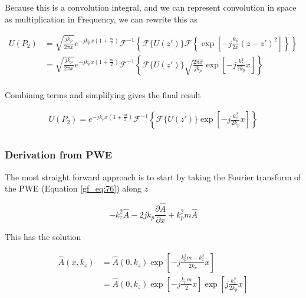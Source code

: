 Because this is a convolution integral, and we can represent convolution in space as multiplication in Frequency, we can rewrite this as

\begin{equation}
\begin{aligned}
U(P_2) &=\sqrt{\frac{jk_p}{2\pi x}}e^{-jk_px\left(1+\frac{m}{2}\right)}\mathcal{F}^{-1}\left\{\mathcal{F}\{U(z')\}\mathcal{F}\left\{ \exp\left[-j \frac{k_p}{2x}\left(z-z'\right)^2 \right]\right\} \right\} \\
&=\sqrt{\frac{jk_p}{2\pi x}}e^{-jk_px\left(1+\frac{m}{2}\right)}\mathcal{F}^{-1}\left\{\mathcal{F}\{U(z')\}\sqrt{\frac{2\pi x}{jk_p}}\exp\left[-j\frac{k_z^2}{2k_p}x \right] \right\} \\
\label{gf_eq:302}
\end{aligned}
\end{equation}
\renewcommand{\baselinestretch}{2} \small\normalsize

\noindent Combining terms and simplifying gives the final result

\begin{equation}
\begin{aligned}
U(P_2) = e^{-jk_px\left(1+\frac{m}{2}\right)}\mathcal{F}^{-1}\left\{\mathcal{F}\{U(z')\}\exp\left[-j\frac{k_z^2}{2k_p}x \right] \right\} \\
\label{gf_eq:303}
\end{aligned}
\end{equation}
\renewcommand{\baselinestretch}{2} \small\normalsize


\subsubsection{Derivation from PWE}
\noindent The most straight forward approach is to start by taking the Fourier transform of the PWE (Equation \ref{gf_eq:76}) along $z$

\begin{equation}
-k_z^2\hat{A} -2jk_p\frac{\partial \hat{A}}{\partial x} +k_p^2m\hat{A}
\label{gf_eq:77}
\end{equation}
\renewcommand{\baselinestretch}{2} \small\normalsize

\noindent This has the solution

\begin{equation}
\begin{aligned}
\hat{A}(x,k_z) &= \hat{A}(0,k_z)\exp\left[-j\frac{k_p^2m-k_z^2}{2k_p}x \right] \\
&= \hat{A}(0,k_z)\exp\left[-j\frac{k_pm}{2}x\right]\exp\left[j\frac{k_z^2}{2k_p}x \right]
\end{aligned}
\label{gf_eq:78}
\end{equation}
\renewcommand{\baselinestretch}{2} \small\normalsize

